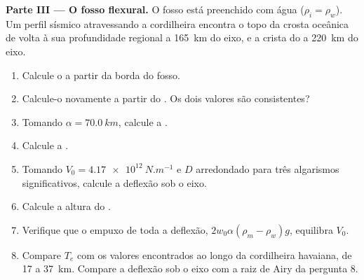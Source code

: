 \begin{problem}
\noindent\textbf{Parte III --- O fosso flexural.} O fosso está preenchido com água
($\rho_i = \rho_w$). Um perfil sísmico atravessando a cordilheira encontra o topo da
crosta oceânica de volta à sua profundidade regional a \qty{165}{km} do eixo, e a
crista do  a \qty{220}{km} do eixo.
\begin{enumerate}[resume]
  \item Calcule o  a partir da borda do fosso.
  \item Calcule-o novamente a partir do . Os dois valores são consistentes?
  \item Tomando $\alpha = \qty{70.0}{km}$, calcule a .
  \item Calcule a .
  \item Tomando $V_0 = \qty{4.17e12}{N.m^{-1}}$ e $D$ arredondado para três
        algarismos significativos, calcule a deflexão sob o eixo.
  \item Calcule a altura do .
  \item Verifique que o empuxo de toda a deflexão, $2w_0\alpha(\rho_m -
        \rho_w)g$, equilibra $V_0$.
  \item Compare $T_e$ com os valores encontrados ao longo da cordilheira havaiana, de 17 a
        \qty{37}{km}. Compare a deflexão sob o eixo com a
        raiz de Airy da pergunta 8.
\end{enumerate}


\end{problem}
